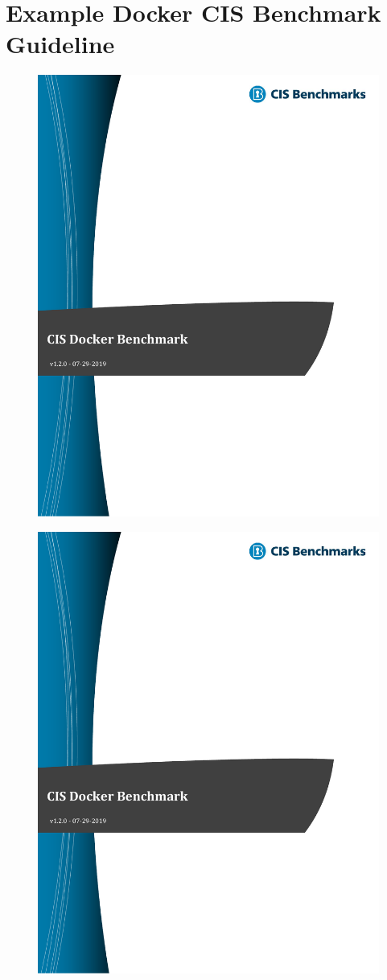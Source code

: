 \chapter{Example Docker CIS Benchmark Guideline}\label{appendix:CIS-Benchmark-Example}
\begin{figure}[ht]
    \centering
    \includegraphics[page=135,width=.8\linewidth]{resources/images/cis_docker_benchmarks.pdf}
\end{figure}

\pagebreak

\begin{figure}[ht]
    \centering
    \includegraphics[page=136,width=.8\textwidth]{resources/images/cis_docker_benchmarks.pdf}
\end{figure}

